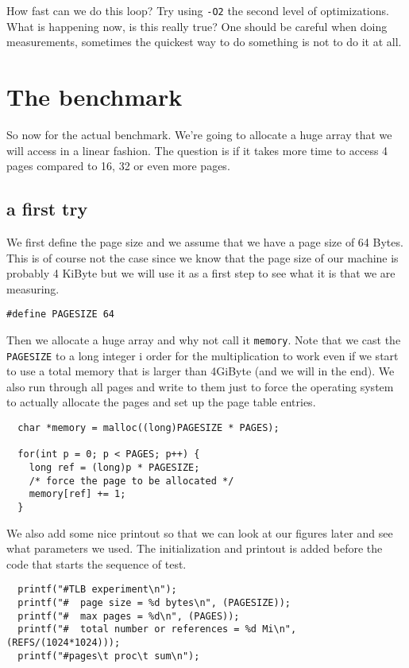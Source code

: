\documentclass[a4paper,11pt]{article}
\begin{document}
How fast can we do this loop? Try using {\tt -O2} the second level of
optimizations. What is happening now, is this really true? One should
be careful when doing measurements, sometimes the quickest way to do
something is not to do it at all.


\section{The benchmark}

So now for the actual benchmark. We're going to allocate a huge array
that we will access in a linear fashion. The question is if it takes
more time to access 4 pages compared to 16, 32 or even more pages.


\subsection{a first try}

We first define the page size and we assume that we have a page size
of 64 Bytes. This is of course not the case since we know that the
page size of our machine is probably 4 KiByte but we will use it as a
first step to see what it is that we are measuring. 

\begin{lstlisting}
#define PAGESIZE 64
\end{lstlisting}

Then we allocate a huge array and why not call it {\tt memory}. Note
that we cast the {\tt PAGESIZE} to a long integer i order for the
multiplication to work even if we start to use a total memory that is
larger than 4GiByte (and we will in the end). We also run through all
pages and write to them just to force the operating system to actually
allocate the pages and set up the page table entries.  


\begin{lstlisting}
  char *memory = malloc((long)PAGESIZE * PAGES);

  for(int p = 0; p < PAGES; p++) {
    long ref = (long)p * PAGESIZE;
    /* force the page to be allocated */
    memory[ref] += 1;
  }    
\end{lstlisting}

We also add some nice printout so that we can look at our figures
later and see what parameters we used. The initialization and printout
is added before the code that starts the sequence of test.

\begin{lstlisting}
  printf("#TLB experiment\n");
  printf("#  page size = %d bytes\n", (PAGESIZE));
  printf("#  max pages = %d\n", (PAGES));
  printf("#  total number or references = %d Mi\n", (REFS/(1024*1024)));  
  printf("#pages\t proc\t sum\n");  
\end{lstlisting}
\end{document}
